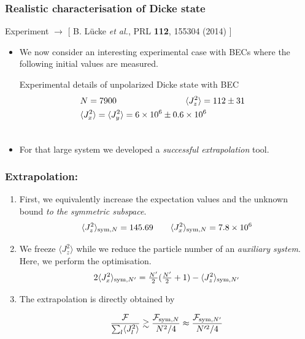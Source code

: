 \documentclass{beamer}
\newcommand{\expect}[1]{\ensuremath{\langle #1 \rangle}}
\newcommand{\citate}[1]{{\footnotesize{\color{gray}[ #1 ]}}

	}
\def\bea{\begin{eqnarray}}
\def\eea{\end{eqnarray}}
\def\nnnl{\nonumber\\}
\begin{document}
		\begin{frame}
			\frametitle{Realistic characterisation of Dicke state}
			{\small Experiment $\rightarrow$}
			\citate{B. L\"ucke {\it et al.}, PRL \textbf{112}, 155304 (2014)}

			\begin{itemize}
				\item We now consider an interesting experimental case with BECs where the following initial values are measured.
				\begin{block}{Experimental details of unpolarized Dicke state with BEC}
					\vspace{-1px}
					\bea
					 	&N = 7900 \hspace{80px} \expect{J_z^2}=112\pm 31 &\nnnl
						&\expect{J_x^2}=\expect{J_y^2}  =  6 \times 10^6 \pm 0.6\times 10^6 &\nnnl
						\nonumber
					\eea
				\end{block}

				\item For that large system we developed a \emph{\color{blue}successful extrapolation} tool.
			\end{itemize}
		\end{frame}

		\begin{frame}
			\frametitle{Extrapolation:}
			\begin{enumerate}
				\item<1-> First, we equivalently increase the expectation values and the unknown bound \emph{\color{blue}to the symmetric subspace}.
					\[
						\expect{J_z^2}_{{\rm sym},N} = 145.69 \qquad
						\expect{J_x^2}_{{\rm sym},N} = 7.8 \times 10^6
					\]
				\item<2-> We freeze $\expect{J_z^2}$ while we reduce the particle number of an \emph{\color{blue}auxiliary system}. Here, we perform the optimisation.
					\[ 2\expect{J_x^2}_{{\rm sym},N'} = \tfrac{N'}{2}(\tfrac{N'}{2}+1)- \expect{J_z^2}_{{\rm sym},N'} \]
				\item<3-> The extrapolation is directly obtained by
				\begin{block}
					{}
					\[ \frac{\mathcal{F}}{\sum_l \expect{J_l^2}}\gtrsim  \frac{\mathcal{F}_{{\rm sym},N}}{N^2/4} \approx \frac{\mathcal{F}_{{\rm sym},N'}}{N'^2/4}
					\]
				\end{block}
			\end{enumerate}
		\end{frame}
\end{document}
